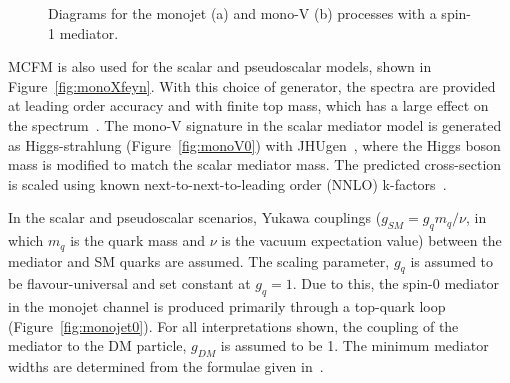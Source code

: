 \begin{figure}[htbp]
  \centering
  \caption{Diagrams for the monojet (a) and mono-V (b) processes with a spin-1 mediator.}
\end{figure}

MCFM is also used for the scalar and pseudoscalar models, shown in Figure~\ref{fig:monoXfeyn}. With this choice of generator, the \pt spectra are provided at leading order accuracy and 
with finite top mass, which has a large effect on the spectrum~\cite{Buckley:2014fba}.
The mono-V signature in the scalar mediator model is generated as Higgs-strahlung (Figure~\ref{fig:monoV0}) with JHUgen~\cite{Anderson:2013afp}, where the Higgs boson mass 
is modified to match the scalar mediator mass. The predicted cross-section is scaled using known next-to-next-to-leading order (NNLO) k-factors~\cite{Heinemeyer:2013tqa}.

In the scalar and pseudoscalar scenarios, Yukawa couplings ($g_{SM}=g_{q}m_{q}/\nu$, in which $m_{q}$ is the quark mass and $\nu$ is the vacuum expectation value) 
between the mediator and SM quarks are assumed. The scaling parameter, $g_{q}$ is assumed to be flavour-universal and set constant at $g_{q}=1$.
Due to this, the spin-0 mediator in the monojet channel is produced primarily through a top-quark loop (Figure~\ref{fig:monojet0}). 
For all interpretations shown, the coupling of the mediator to the DM particle, $g_{DM}$ is assumed to be 1. The minimum mediator widths are determined from the formulae given in~\cite{Harris:2014hga}.

